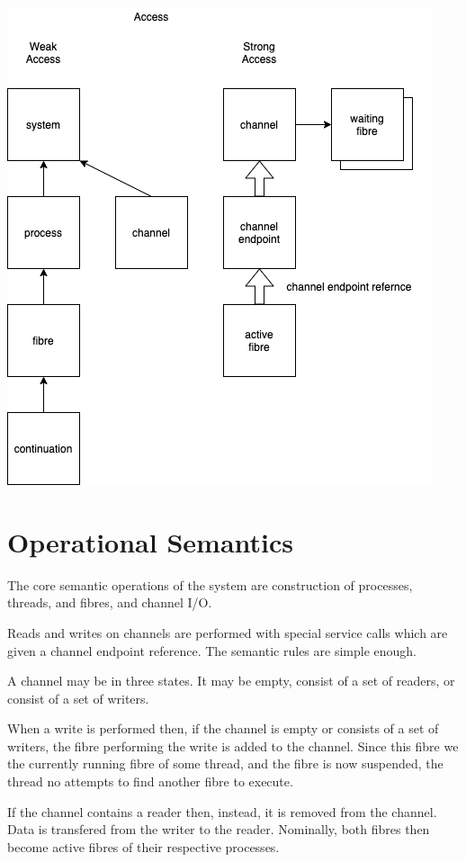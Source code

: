 \documentclass[oneside]{book}
\begin{document}
\includegraphics{../src/tex/weak_access.png}

\chapter{Operational Semantics}
The core semantic operations of the system are construction of
processes, threads, and fibres, and channel I/O.

Reads and writes on channels are performed with special service calls
which are given a channel endpoint reference. The semantic rules
are simple enough.

A channel may be in three states. It may be empty, consist of a set
of readers, or consist of a set of writers.

When a write is performed then, if the channel is empty or consists 
of a set of writers, the fibre performing the write is added to the channel.
Since this fibre we the currently running fibre of some thread, and the
fibre is now suspended, the thread no attempts to find another 
fibre to execute.

If the channel contains a reader then, instead, it is removed from
the channel. Data is transfered from the writer to the reader.
Nominally, both fibres then become active fibres of their 
respective processes.
\end{document}
